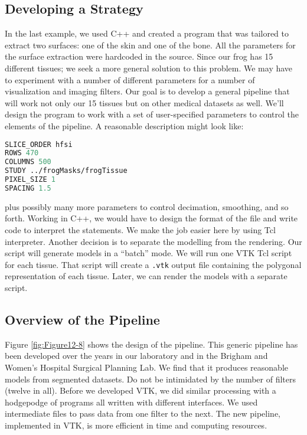 \subsection{Developing a Strategy}

In the last example, we used C++ and created a program that was tailored to extract two surfaces: one of the skin and one of the bone. All the parameters for the surface extraction were hardcoded in the source. Since our frog has 15 different tissues; we seek a more general solution to this problem. We may have to experiment with a number of different parameters for a number of visualization and imaging filters. Our goal is to develop a general pipeline that will work not only our 15 tissues but on other medical datasets as well. We'll design the program to work with a set of user-specified parameters to control the elements of the pipeline. A reasonable description might look like:

\begin{lstlisting}[language=TCL, caption={User specified parameters to control the elements of the pipeline.}]
SLICE_ORDER hfsi
ROWS 470
COLUMNS 500
STUDY ../frogMasks/frogTissue
PIXEL_SIZE 1
SPACING 1.5
\end{lstlisting}

plus possibly many more parameters to control decimation, smoothing, and so forth. Working in C++, we would have to design the format of the file and write code to interpret the statements. We make the job easier here by using Tcl interpreter. Another decision is to separate the modelling from the rendering. Our script will generate models in a ``batch'' mode. We will run one VTK Tcl script for each tissue. That script will create a \texttt{.vtk} output file containing the polygonal representation of each tissue. Later, we can render the models with a separate script.

\subsection{Overview of the Pipeline}

Figure \ref{fig:Figure12-8} shows the design of the pipeline. This generic pipeline has been developed over the years in our laboratory and in the Brigham and Women's Hospital Surgical Planning Lab. We find that it produces reasonable models from segmented datasets. Do not be intimidated by the number of filters (twelve in all). Before we developed VTK, we did similar processing with a hodgepodge of programs all written with different interfaces. We used intermediate files to pass data from one filter to the next. The new pipeline, implemented in VTK, is more efficient in time and computing resources.

